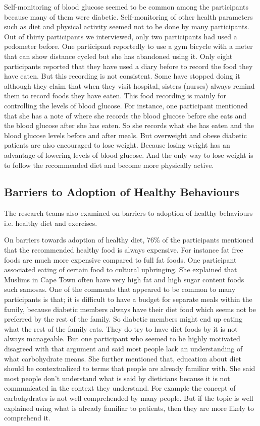 Self-monitoring of blood glucose seemed to be common among the participants because many of them were diabetic. Self-monitoring of other health parameters such as diet and physical activity seemed not to be done by many participants. Out of thirty participants we interviewed, only two participants had used a pedometer before.  One participant reportedly to use a gym bicycle with a meter that can show distance cycled but she has abandoned using it. Only eight participants reported that they have used a diary before to record the food they have eaten. But this recording is not consistent. Some have stopped doing it although they claim that when they visit hospital, sisters (nurses) always remind them to record foods they have eaten. This food recording is mainly for controlling the levels of blood glucose. For instance, one participant mentioned that she has a note of where she records the blood glucose before she eats and the blood glucose after she has eaten. So she records what she has eaten and the blood glucose levels before and after meals. But overweight and obese diabetic patients are also encouraged to lose weight. Because losing weight has an advantage of lowering levels of blood glucose.  And the only way to lose weight is to follow the recommended diet and become more physically active. 
\subsection{Barriers to Adoption of Healthy Behaviours}
The research teams also examined on barriers to adoption of healthy behaviours i.e. healthy diet and exercises.

On barriers towards adoption of healthy diet, 76\% of the participants mentioned that the recommended healthy food is always expensive. For instance fat free foods are much more expensive compared to full fat foods. One participant associated eating of certain food to cultural upbringing. She explained that Muslims in Cape Town often have very high fat and high sugar content foods  such samosas. One of the comments that appeared to be common to many participants is that; it is difficult to have a budget for separate meals within the family, because diabetic members always have their diet food which seems not be preferred by the rest of the family. So diabetic members might end up eating what the rest of the family eats. They do try to have diet foods by it is not always manageable. But one participant who seemed to be highly motivated disagreed with that argument and said most people lack an understanding of what carbohydrate means. She further mentioned that, education about diet should be contextualized to terms that people are already familiar with. She said most people don't understand what is said by dieticians because it is not communicated in the context they understand. For example the concept of carbohydrates is not well comprehended by many people. But if the topic is well explained using what is already familiar to patients, then they are more likely to comprehend it.

